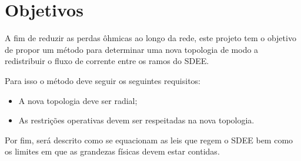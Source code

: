 \section{Objetivos}

A fim de reduzir as perdas ôhmicas ao longo da rede, este projeto tem o objetivo de propor um método para determinar uma nova topologia de modo a redistribuir o fluxo de corrente entre os ramos do SDEE.

Para isso o método deve seguir os seguintes requisitos:

\begin{itemize}
    \item A nova topologia deve ser radial;
    
    \item As restrições operativas devem ser respeitadas na nova topologia.
\end{itemize}

Por fim, será descrito como se equacionam as leis que regem o SDEE bem como os limites em que as grandezas físicas devem estar contidas.
